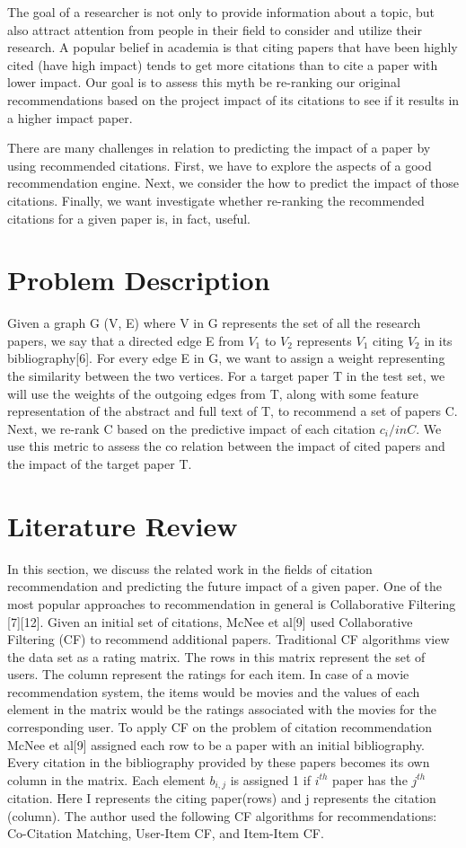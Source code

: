 \documentclass[journal]{IEEEtran}
\begin{document}
The goal of a researcher is not only to provide information about a topic, but also attract attention from people in their field to consider and utilize their research. A popular belief in academia is that citing papers that have been highly cited (have high impact) tends to get more citations than to cite a paper with lower impact.   Our goal is to assess this myth be re-ranking our original recommendations based on the project impact of its citations to see if it results in a higher impact paper.  

There are many challenges in relation to predicting the impact of a paper by using recommended citations.  First, we have to explore the aspects of a good recommendation engine.  Next, we consider the how to predict the impact of those citations.  Finally, we want investigate whether re-ranking the recommended citations for a given paper is, in fact, useful.

\section{Problem Description}

Given a graph G (V, E) where V in G represents the set of all the research papers,  we say that a directed edge E from $V_1$ to $V_2$ represents $V_1$ citing $V_2$ in its bibliography[6].  For every edge E in G, we want to assign a weight representing the similarity between the two vertices.  For a target paper T in the test set, we will use the weights of the outgoing edges from T, along with some feature representation of the abstract and full text of T, to recommend a set of papers C.  Next, we re-rank C based on the predictive impact of each citation $c_{i}/inC$.  We use this metric to assess the co relation between the impact of cited papers and the impact of the target paper T.  

\section{Literature Review}
In this section, we discuss the related work in the fields of citation recommendation and predicting the future impact of a given paper.  One of the most popular approaches to recommendation in general is Collaborative Filtering [7][12].  Given an initial set of citations, McNee et al[9] used Collaborative Filtering (CF) to recommend additional papers.   Traditional CF algorithms view the data set as a rating matrix.  The rows in this matrix represent the set of users.  The column represent the ratings for each item.  In case of a movie recommendation system, the items would be movies and the values of each element in the matrix would be the ratings associated with the movies for the corresponding user.   To apply CF on the problem of citation recommendation McNee et al[9] assigned each row to be a paper with an initial bibliography.  Every citation in the bibliography provided by these papers becomes its own column in the matrix. Each element $b_{i,j}$ is assigned 1 if $i^{th}$ paper has the $j^{th}$ citation.  Here I represents the citing paper(rows) and j represents the citation (column).   The author used the following CF algorithms for recommendations: Co-Citation Matching, User-Item CF, and Item-Item CF.  
\end{document}
